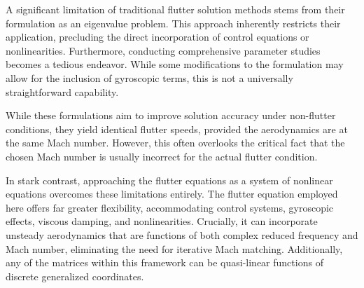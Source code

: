 \documentclass[10pt,openany,twoside]{book}
\numberwithin{equation}{section}   %
\newcommand{\Gc}{GC}
\newcommand{\Eqn}[1]{Eq.\ \ref{#1}}
\begin{document}
% 
% 
A significant limitation of traditional flutter solution methods stems
from their formulation as an eigenvalue problem. This approach inherently
restricts their application, precluding the direct incorporation of
control equations or nonlinearities. Furthermore, conducting comprehensive
parameter studies becomes a tedious endeavor. While some modifications
to the formulation may allow for the inclusion of gyroscopic terms,
this is not a universally straightforward capability.

While these formulations aim to improve solution accuracy under
non-flutter conditions, they yield identical flutter speeds, provided the
aerodynamics are at the same Mach number. However, this often overlooks
the critical fact that the chosen Mach number is usually incorrect for
the actual flutter condition.

In stark contrast, approaching the flutter equations as a system
of nonlinear equations overcomes these limitations entirely. The
flutter equation employed here offers far greater flexibility,
accommodating control systems, gyroscopic effects, viscous damping,
and nonlinearities. Crucially, it can incorporate unsteady aerodynamics
that are functions of both complex reduced frequency and Mach number,
eliminating the need for iterative Mach matching. Additionally, any
of the matrices within this framework can be quasi-linear functions of
discrete generalized coordinates.
\end{document}
